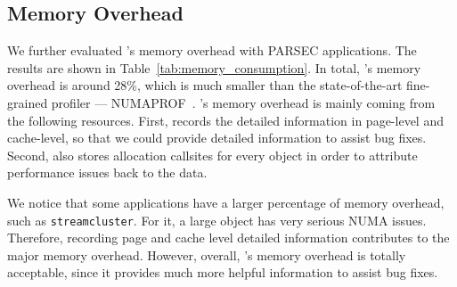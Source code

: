 
\subsection{Memory Overhead}
\label{sec:memory}


We further evaluated \NP{}'s memory overhead with PARSEC applications. The results are shown in Table~\ref{tab:memory_consumption}. In total, \NP{}'s memory overhead is around 28\%, which is much smaller than the state-of-the-art fine-grained profiler --- NUMAPROF~\cite{valat:2018:numaprof}. \NP{}'s memory overhead is mainly coming from the following resources. First, \NP{} records the detailed information in page-level and cache-level, so that we could provide detailed information to assist bug fixes. Second, \NP{} also stores allocation callsites for every object in order to attribute performance issues back to the data. 

We  notice that some applications have a larger percentage of memory overhead, such as \texttt{streamcluster}. For it, a large object has very serious NUMA issues. Therefore, recording page and cache level detailed information contributes to the major memory overhead. However, overall, \NP{}'s memory overhead is totally acceptable, since it provides much more helpful information to assist bug fixes. 


